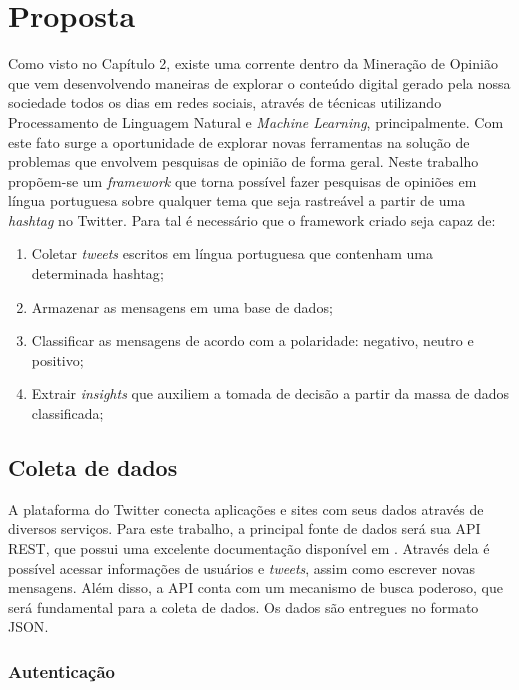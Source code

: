 \chapter{Proposta} \label{cap:proposta}

Como visto no Capítulo 2, existe uma corrente dentro da Mineração de Opinião que vem desenvolvendo maneiras de explorar o conteúdo digital gerado pela nossa sociedade todos os dias em redes sociais, através de técnicas utilizando Processamento de Linguagem Natural e \textit{Machine Learning}, principalmente. Com este fato surge a oportunidade de explorar novas ferramentas na
solução de problemas que envolvem pesquisas de opinião de forma geral.
Neste trabalho propõem-se um \textit{framework} que torna possível fazer pesquisas de opiniões em língua portuguesa sobre qualquer tema que seja rastreável a partir de uma \textit{hashtag} no Twitter.
Para tal é necessário que o framework criado seja capaz de:

\begin{enumerate}
	\item Coletar \textit{tweets} escritos em língua portuguesa que contenham uma determinada {hashtag};
	\item Armazenar as mensagens em uma base de dados;
	\item Classificar as mensagens de acordo com a polaridade: negativo, neutro e positivo;
	\item Extrair \textit{insights} que auxiliem a tomada de decisão a partir da massa de dados classificada;
\end{enumerate}

\section{Coleta de dados}
A plataforma do Twitter conecta aplicações e sites com seus dados através de diversos serviços. Para este trabalho, a principal fonte de dados será sua API REST, que possui uma excelente documentação disponível em \cite{twitterapidocs}. Através dela é possível acessar informações de usuários e \textit{tweets}, assim como escrever novas mensagens. Além disso, a API conta com um mecanismo de busca poderoso, que será fundamental para a coleta de dados. Os dados são entregues no formato \ac{JSON}.

\subsection{Autenticação}

